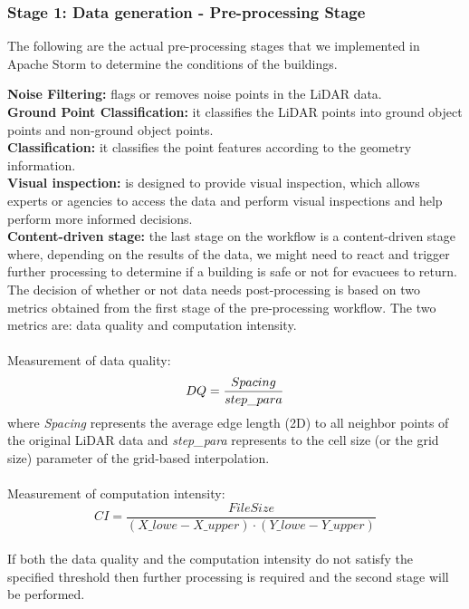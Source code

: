 \subsubsection{Stage 1: Data generation - Pre-processing Stage}
The following are the actual pre-processing stages that we implemented in Apache Storm to determine the  conditions of the buildings.

\noindent\textbf{Noise Filtering:} flags or removes noise points in the LiDAR data.
\\
\noindent\textbf{Ground Point Classification:} it classifies the LiDAR points into ground object points and non-ground object points.
\\
\noindent\textbf{Classification:} it classifies the point features according to the geometry information. 
\\
\noindent\textbf{Visual inspection:} is designed to provide visual inspection, which allows experts or agencies to access the data and perform visual inspections and help perform more informed decisions.
\\
\noindent\textbf{Content-driven stage:} the last stage on the workflow is a content-driven stage where, depending on the results of the data, we might need to react and trigger further processing to determine if a building is safe or not for evacuees to return. The decision of whether or not data needs post-processing is based on two metrics obtained from the first stage of the pre-processing workflow. The two metrics are: data quality and computation intensity. 
\\
\\
Measurement of data quality: 
\begin{equation}
DQ=\frac{Spacing}{step\_para}\\
\end{equation}
where \textit{Spacing} represents the average edge length (2D) to all neighbor points of the original LiDAR data and \textit{step\_para} represents to the cell size (or the grid size) parameter of the grid-based interpolation.\\
\\
Measurement of computation intensity: 
\begin{equation}
CI=\frac{FileSize}{(X\_lowe - X\_upper) \cdot (Y\_lowe - Y\_upper)}
\end{equation}
\\
\noindent If both the data quality and the computation intensity do not satisfy the specified threshold then further processing is required and the second stage will be performed. 

